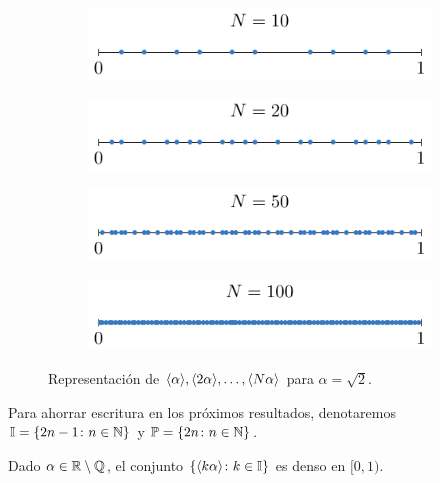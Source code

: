 \documentclass[a4paper, 12pt, oneside]{book}
\begin{document}
\begin{figure}[H]
\centering
\begin{subfigure}[b]{0.49\textwidth}
    \centering
    \includegraphics{./plot9/main.pdf}
\end{subfigure}
\begin{subfigure}[b]{0.49\textwidth}
    \centering
    \includegraphics{./plot10/main.pdf}
\end{subfigure}
\par\bigskip
\begin{subfigure}[b]{0.49\textwidth}
    \centering
    \includegraphics{./plot11/main.pdf}
\end{subfigure}
\begin{subfigure}[b]{0.49\textwidth}
    \centering
    \includegraphics{./plot12/main.pdf}
\end{subfigure}
\caption{Representación de $\langle \alpha \rangle,\langle 2\alpha \rangle,\mathellipsis,\langle N\alpha \rangle$ para $\alpha = \sqrt{2}$.}
\end{figure}

Para ahorrar escritura en los próximos resultados, denotaremos $\mathbb I = \{2n-1 \colon n \in \mathbb N\}$ y $\mathbb{P} = \{2n \colon n \in \mathbb N\}$.

\begin{lemma}
    Dado $\alpha \in \mathbb R \setminus \mathbb Q$, el conjunto $\{\langle k\alpha \rangle \colon k \in \mathbb I\}$ es denso en $[0,1)$.
\end{lemma}
\end{document}
